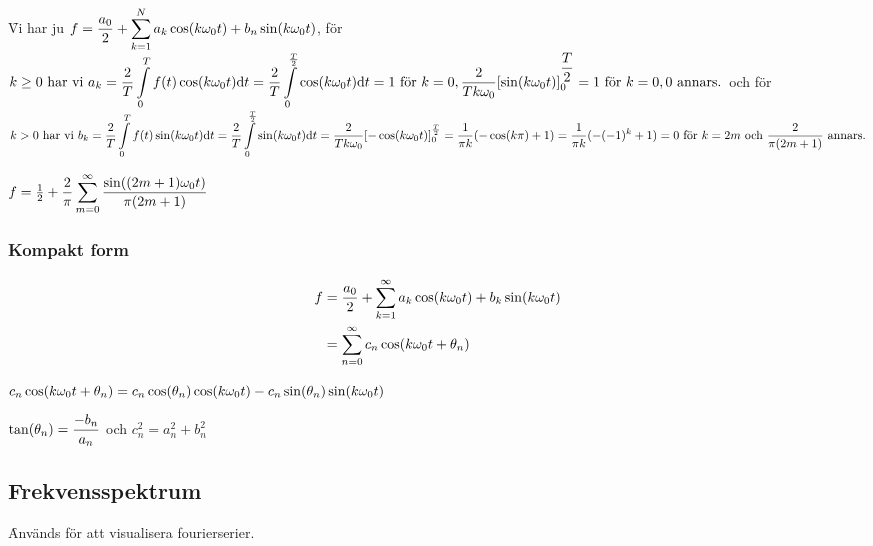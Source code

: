 \documentclass[a4paper]{article}
\begin{document}


\begin{ex}
    \f

    Vi har ju \(
        f = \displaystyle\frac{a_0}{2} + \displaystyle\sum_{k=1}^N a_k \cos(k \omega_0 t) + b_n \sin(k \omega_0 t)
    \), för \(k \geq 0 \text{ har vi } 
        a_k = \displaystyle\frac{2}{T} \displaystyle\int\limits_0^T f(t) \cos(k \omega_0 t)\dd t = \displaystyle\frac{2}{T} \displaystyle\int\limits_0^{\frac{T}{2}} \cos(k \omega_0 t)\dd t = 
        1 \text{ för } k = 0, 
        \displaystyle\frac{2}{Tk\omega_0}[\sin(k\omega_0t)]_0^{\displaystyle\frac{T}{2}} 
        = 1 \text{ för } k = 0, 0 \text{ annars.} 
    \) och för \( k > 0 \text{ har vi } 
        b_k = \displaystyle\frac{2}{T} \displaystyle\int\limits_0^T f(t) \sin(k \omega_0 t)\dd t = 
        \displaystyle\frac{2}{T} \displaystyle\int\limits_0^{\frac{T}{2}} \sin(k \omega_0 t)\dd t =
        \displaystyle\frac{2}{Tk\omega_0}[-\cos(k\omega_0t)]_0^{\frac{T}{2}} =
        \displaystyle\frac{1}{\pi k} (-\cos(k\pi) + 1) =
        \displaystyle\frac{1}{\pi k} (- (-1)^k + 1) =
        0 \text{ för } k = 2m \text{ och } \displaystyle\frac{2}{\pi(2m+1)} \text{ annars.}  
    \)

    \(
        f = \frac{1}{2} + \displaystyle\frac{2}{\pi} \displaystyle\sum_{m=0}^\infty \displaystyle\frac{\sin((2m+1)\omega_0 t)}{\pi(2m+1)} 
    \) 
\end{ex}

\subsubsection{Kompakt form}
\begin{align*}
    f &= \displaystyle\frac{a_0}{2} + \displaystyle\sum_{k=1}^\infty a_k \cos(k \omega_0 t) + b_k \sin(k \omega_0 t) \\
      &= \displaystyle\sum_{n=0}^\infty c_n \cos(k \omega_0 t + \theta_n)
\end{align*}

\(
    c_n \cos(k \omega_0 t + \theta_n) = c_n \cos(\theta_n) \cos(k \omega_0 t) -  c_n \sin(\theta_n) \sin(k \omega_0 t)
\)    

\(
    \tan(\theta_n) = \displaystyle\frac{-b_n}{a_n} 
\) och \(
    c_n^2 = a_n^2 + b_n^2
\) 

\subsection{Frekvensspektrum}
\f

Används för att visualisera fourierserier.
\end{document}
